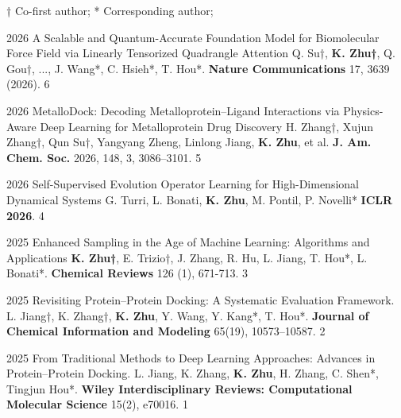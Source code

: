 
† Co-first author; * Corresponding author;

\pubitem
  {2026}
  {A Scalable and Quantum-Accurate Foundation Model for Biomolecular Force Field via Linearly Tensorized Quadrangle Attention}
  {Q. Su†, \textbf{\textcolor{awesome}{K. Zhu†}}, Q. Gou†, ..., J. Wang*, C. Hsieh*, T. Hou*.
   \textbf{\textcolor{awesome}{Nature Communications}} 17, 3639 (2026).}
  {6}

\pubitem
  {2026}
  {MetalloDock: Decoding Metalloprotein–Ligand Interactions via Physics-Aware Deep Learning for Metalloprotein Drug Discovery}
  {H. Zhang†, Xujun Zhang†, Qun Su†, Yangyang Zheng, Linlong Jiang, \textbf{\textcolor{awesome}{K. Zhu}}, et al. 
   \textbf{\textcolor{awesome}{J. Am. Chem. Soc.}} 2026, 148, 3, 3086–3101.}
  {5}

\pubitem
  {2026}
  {Self-Supervised Evolution Operator Learning for High-Dimensional Dynamical Systems}
  {G. Turri, L. Bonati, \textbf{\textcolor{awesome}{K. Zhu}}, M. Pontil, P. Novelli*
   \textbf{\textcolor{awesome}{ICLR 2026}}.}
  {4}

\pubitem
  {2025}
  {Enhanced Sampling in the Age of Machine Learning: Algorithms and Applications}
  {\textbf{\textcolor{awesome}{K. Zhu†}}, E. Trizio†, J. Zhang, R. Hu, L. Jiang, T. Hou*, L. Bonati*. 
   \textbf{\textcolor{awesome}{Chemical Reviews}} 126 (1), 671-713.}
  {3}
  
\pubitem
  {2025}
  {Revisiting Protein–Protein Docking: A Systematic Evaluation Framework.}
  {L. Jiang†, K. Zhang†, \textbf{\textcolor{awesome}{K. Zhu}}, Y. Wang, Y. Kang*, T. Hou*. 
   \textbf{\textcolor{awesome}{Journal of Chemical Information and Modeling}} 65(19), 10573–10587.}
  {2}
  
\pubitem
  {2025}
  {From Traditional Methods to Deep Learning Approaches: Advances in Protein–Protein Docking.}
  {L. Jiang, K. Zhang, \textbf{\textcolor{awesome}{K. Zhu}}, H. Zhang, C. Shen*, Tingjun Hou*. 
   \textbf{\textcolor{awesome}{Wiley Interdisciplinary Reviews: Computational Molecular Science}} 15(2), e70016.}
  {1}